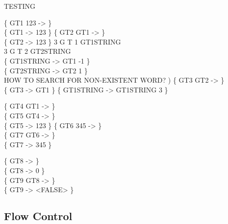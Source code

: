 \begin{tt}
TESTING  \word{[']}       

\{ \word{:} GT1 123 \word{;} -> \} \\
\{  GT1  -> 123 \}
\{ \word{:} GT2 \word{[']} GT1 \word{;}  -> \} \\
\{ GT2  -> 123 \}
	3 
	 G 
	 T 
	 1 
	 GT1STRING \\
	3 
	 G 
	 T 
	 2 
	 GT2STRING \\
\{ GT1STRING  ->  GT1 -1 \} \\
\{ GT2STRING  ->  GT2 1  \} \\
 HOW TO SEARCH FOR NON-EXISTENT WORD? )
\{ \word{:} GT3 GT2  \word{;} -> \} \\
\{ GT3 ->  GT1 \}
\{ GT1STRING  -> GT1STRING  3 \}

\{ \word{:} GT4  GT1 \word{;}  -> \} \\
\{ \word{:} GT5 GT4 \word{;} -> \} \\
\{ GT5 -> 123 \}
\{ \word{:} GT6 345 \word{;}  -> \} \\
\{ \word{:} GT7  GT6 \word{;} -> \} \\
\{ GT7 -> 345 \}

\{ \word{:} GT8   \word{;}  -> \} \\
\{ GT8 -> 0 \} \\
\{ \word{:} GT9 GT8  \word{;} -> \} \\
\{ GT9  -> <FALSE> \}
\end{tt}

\subsection{Flow Control}

